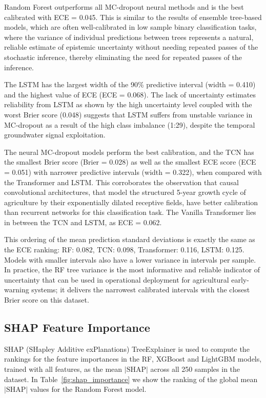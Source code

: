 \documentclass{ieeeaccess}
\begin{document}
Random Forest outperforms all MC-dropout neural methods and is the best calibrated with ECE = 0.045. This is similar to the results of ensemble tree-based models, which are often well-calibrated in low sample binary classification tasks, where the variance of individual predictions between trees represents a natural, reliable estimate of epistemic uncertainty without needing repeated passes of the stochastic inference, thereby eliminating the need for repeated passes of the inference.

The LSTM has the largest width of the 90\% predictive interval (width = 0.410) and the highest value of ECE (ECE = 0.068). The lack of uncertainty estimates reliability from LSTM as shown by the high uncertainty level coupled with the worst Brier score (0.048) suggests that LSTM suffers from unstable variance in MC-dropout as a result of the high class imbalance (1:29), despite the temporal groundwater signal exploitation.

The neural MC-dropout models perform the best calibration, and the TCN has the smallest Brier score (Brier = 0.028) as well as the smallest ECE score (ECE = 0.051) with narrower predictive intervals (width = 0.322), when compared with the Transformer and LSTM. This corroborates the observation that causal convolutional architectures, that model the structured 5-year growth cycle of agriculture by their exponentially dilated receptive fields, have better calibration than recurrent networks for this classification task. The Vanilla Transformer lies in between the TCN and LSTM, as ECE = 0.062.

This ordering of the mean prediction standard deviations is exactly the same as the ECE ranking: RF: 0.082, TCN: 0.098, Transformer: 0.116, LSTM: 0.125. Models with smaller intervals also have a lower variance in intervals per sample. In practice, the RF tree variance is the most informative and reliable indicator of uncertainty that can be used in operational deployment for agricultural early-warning systems; it delivers the narrowest calibrated intervals with the closest Brier score on this dataset.

\subsection{SHAP Feature Importance}

SHAP (SHapley Additive exPlanations) TreeExplainer \cite{lundberg2017} is used to compute the rankings for the feature importances in the RF, XGBoost and LightGBM models, trained with all features, as the mean $|\text{SHAP}|$ across all 250 samples in the dataset. In Table~\ref{fig:shap_importance} we show the ranking of the global mean $|\text{SHAP}|$ values for the Random Forest model.
\end{document}
